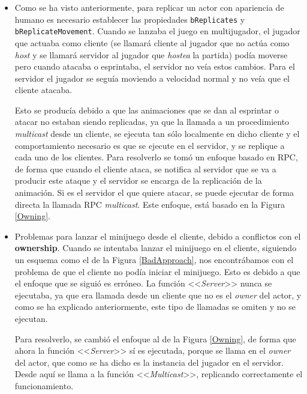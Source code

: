 \begin{itemize}
\item Como se ha visto anteriormente, para replicar un actor con apariencia de humano es necesario establecer las propiedades \texttt{bReplicates} y \texttt{bReplicateMovement}. Cuando se lanzaba el juego en multijugador, el jugador que actuaba como cliente (se llamará cliente al jugador que no actúa como \textit{host} y se llamará servidor al jugador que \textit{hostea} la partida) podía moverse pero cuando atacaba o esprintaba, el servidor no veía estos cambios. Para el servidor el jugador se seguía moviendo a velocidad normal y no veía que el cliente atacaba. 

Esto se producía debido a que las animaciones que se dan al esprintar o atacar no estaban siendo replicadas, ya que la llamada a un procedimiento \textit{multicast} desde un cliente, se ejecuta tan sólo localmente en dicho cliente y el comportamiento necesario es que se ejecute en el servidor, y se replique a cada uno de los clientes. Para resolverlo se tomó un enfoque basado en \ac{RPC}, de forma que cuando el cliente ataca, se notifica al servidor que se va a producir este ataque y el servidor se encarga de la replicación de la animación. Si es el servidor el que quiere atacar, se puede ejecutar de forma directa la llamada \ac{RPC} \textit{multicast}. Este enfoque, está basado en la Figura \ref{Owning}.

\item Problemas para lanzar el minijuego desde el cliente, debido a conflictos con el \textbf{ownership}. Cuando se intentaba lanzar el minijuego en el cliente, siguiendo un esquema como el de la Figura \ref{BadApproach}, nos encontrábamos con el problema de que el cliente no podía iniciar el minijuego. Esto es debido a que el enfoque que se siguió es erróneo. La función <<\textit{Server}>> nunca se ejecutaba, ya que era llamada desde un cliente que no es el \textit{owner} del actor, y como se ha explicado anteriormente, este tipo de llamadas se omiten y no se ejecutan.

Para resolverlo, se cambió el enfoque al de la Figura \ref{Owning}, de forma que ahora la función <<\textit{Server}>> sí es ejecutada, porque se llama en el \textit{owner} del actor, que como se ha dicho es la instancia del jugador en el servidor. Desde aquí se llama a la función <<\textit{Multicast}>>, replicando correctamente el funcionamiento.


\end{itemize}
